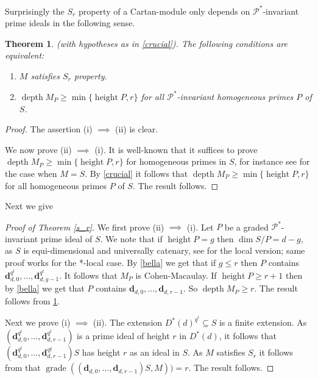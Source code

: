 \documentclass{amsart}
\newcommand{\CM}{Cohen-Macaulay}
\newcommand{\Pc}{\mathcal{P} }
\newcommand{\db}{\mathbf{d} }
\newcommand{\grade}{\operatorname{grade}}
\newcommand{\depth}{\operatorname{depth}}
\newcommand{\height}{\operatorname{height}}
\theoremstyle{plain}
\newtheorem{theorem}{Theorem}[section]
\theoremstyle{definition}
\theoremstyle{remark}
\begin{document}
Surprisingly  the $S_r$ property of a Cartan-module only depends on $\Pc^*$-invariant prime ideals in the following sense.
\begin{theorem}\label{sr}(with hypotheses as in \ref{crucial}).  The following conditions are equivalent:
  \begin{enumerate}[\rm (i)]
    \item $M$ satisfies $S_r$ property.
    \item $\depth M_P \geq \min\{\height P, r \}$  for all $\Pc^*$-invariant homogeneous primes $P$ of $S$.
  \end{enumerate}
\end{theorem}
\begin{proof}
The assertion (i) $\implies$ (ii) is clear.

We now prove (ii) $\implies$ (i). It is well-known that it  suffices to prove $\depth M_P \geq \min \{\height P, r \}$ for homogeneous primes in $S$, for instance  see \cite[10.3]{P} for the case when $M = S$.
By \ref{crucial} it follows that $\depth M_P \geq \min \{ \height P, r \}$ for all homogeneous primes $P$ of $S$. The result follows.
\end{proof}

Next we give
\begin{proof}[Proof of Theorem \ref{s_r}]
We first prove (ii) $\implies $ (i). Let $P$ be a graded $\Pc^*$-invariant prime ideal of $S$. We note that if  $\height P = g$ then $\dim S/P = d - g$, as $S$ is equi-dimensional and universally catenary, see \cite[Lemma 2, p.\ 250]{Ma} for the local version; same proof works for the *-local case. By \ref{bella} we get that if $g \leq r$ then $P$ contains $\db_{d,0}^{q^t}, \ldots, \db_{d,g-1}^{q^t}$.
It follows that $M_P$ is \CM. If $\height P \geq r + 1$ then by \ref{bella}  we get that  $P$ contains $\db_{d,0}, \ldots, \db_{d,r-1}$.
So $\depth M_P \geq r$. The result follows from \ref{sr}.

Next we prove  (i) $\implies $ (ii). The extension $D^*(d)^{q^t} \subseteq S$ is a finite extension. As $(\db_{d,0}^{q^t}, \ldots, \db_{d,r-1}^{q^t})$ is a prime ideal of height $r$ in $D^*(d)$, it follows that $(\db_{d,0}^{q^t}, \ldots, \db_{d,r-1}^{qt})S$ has height $r$ as an ideal in $S$. As $M$ satisfies $S_r$ it follows from \cite[1.2.10]{BH} that $\grade \left( (\db_{d,0}, \ldots, \db_{d,r-1})S, M \right)) = r$. The result follows.
\end{proof}
\end{document}
